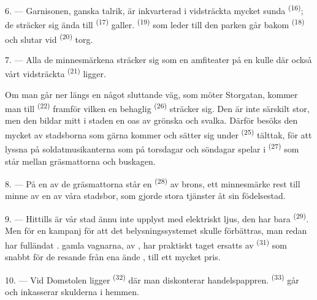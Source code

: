 \VUsaut{5.0mm}
\VUsaut{3.4mm}

6. --- Garnisonen, ganska talrik, är inkvarterad i vidsträckta mycket sunda
 \textsuperscript{(16)}; de sträcker sig ända till
 \textsuperscript{(17)} galler. 
\textsuperscript{(19)} som leder till den parken går bakom 
\textsuperscript{(18)} och slutar vid  \textsuperscript{(20)} torg.

7. --- Alla de minnesmärkena sträcker sig som en amfiteater på en kulle där också vårt
vidsträckta  \textsuperscript{(21)} ligger.

Om man går ner längs en något sluttande väg, som möter Storgatan, kommer man till
 \textsuperscript{(22)} framför vilken en behaglig
 \textsuperscript{(26)} sträcker sig. Den
 är inte särskilt stor, men den bildar mitt i staden en oas
av grönska och svalka. Därför besöks den mycket av stadsborna som gärna kommer och sätter sig
under  \textsuperscript{(25)} tälttak, för att lyssna på soldatmusikanterna
som på torsdagar och söndagar spelar i
 \textsuperscript{(27)} som står mellan gräsmattorna och
buskagen.

8. --- På en av de gräsmattorna står en  \textsuperscript{(28)} av brons, ett
minnesmärke rest till minne av en av våra stadsbor, som gjorde stora tjänster åt sin
födelsestad.

\VUsaut{4.0mm}
\VUsaut{3.4mm}

9. --- Hittills är vår stad ännu inte upplyst med elektriskt ljus, den har bara
 \textsuperscript{(29)}. Men  för en
kampanj för att det belysningssystemet skulle förbättras,  man redan har
fulländat .  gamla vagnarna, 
av , har praktiskt taget ersatts av
 \textsuperscript{(31)} som snabbt för de resande
från  ena ände , till ett mycket
 pris.

10. --- Vid Domstolen ligger  \textsuperscript{(32)} där man diskonterar
handelspappren.  \textsuperscript{(33)} går och inkasserar skulderna
i hemmen.

